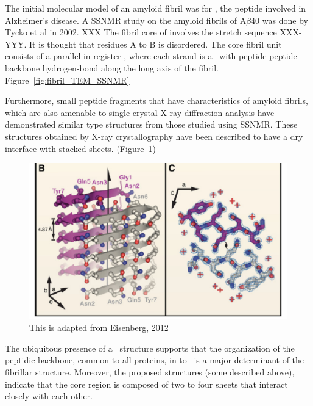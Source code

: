 
The initial molecular model of an amyloid fibril was for , the peptide involved in Alzheimer's disease.  A SSNMR study on the amyloid fibrils of A$\beta$40 was done by Tycko et al in 2002. XXX The fibril core of  involves the stretch sequence XXX-YYY. It is thought that residues A to B is disordered. The core fibril unit consists of a parallel in-register \bsheet, where each strand is a \bhairpin\ with peptide-peptide backbone hydrogen-bond along the long axis of the fibril. Figure~\ref{fig:fibril_TEM_SSNMR}


Furthermore, small peptide fragments that have characteristics of amyloid fibrils, which are also amenable to single crystal X-ray diffraction analysis have demonstrated similar type structures from those studied using SSNMR.  These structures obtained by X-ray crystallography have been described to have a dry interface with stacked sheets. (Figure~\ref{fig:fibril_xray_model})

\begin{figure}
  \centering
  \includegraphics[width=6in]{figures/introduction/fibril_xray_model.pdf}
  \caption[Characteristic cross-$\beta$ spacings from X-ray fibre diffraction studies of amyloid fibrils]{This is adapted from Eisenberg, 2012}
  \label{fig:fibril_xray_model}
\end{figure}

The ubiquitous presence of a \crossb\ structure supports that the organization of the peptidic backbone, common to all proteins, in to \bsheets\ is a major determinant of the fibrillar structure. Moreover, the proposed structures (some described above), indicate that the core region is composed of two to four sheets that interact closely with each other.

